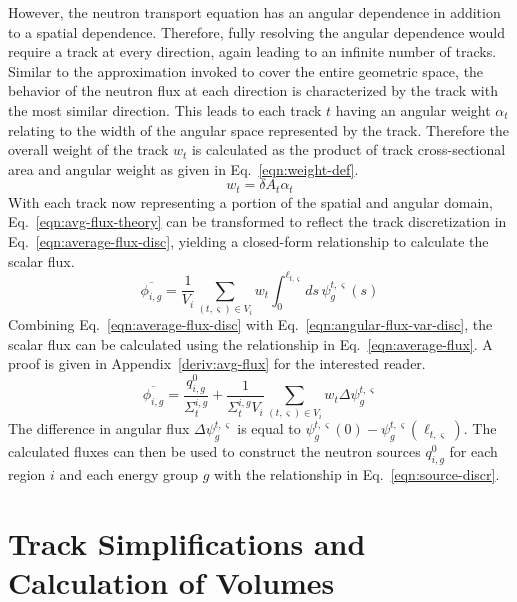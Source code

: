However, the neutron transport equation has an angular dependence in addition to a spatial dependence. Therefore, fully resolving the angular dependence would require a track at every direction, again leading to an infinite number of tracks. Similar to the approximation invoked to cover the entire geometric space, the behavior of the neutron flux at each direction is characterized by the track with the most similar direction. This leads to each track $t$ having an angular weight $\alpha_t$ relating to the width of the angular space represented by the track. Therefore the overall weight of the track $w_t$ is calculated as the product of track cross-sectional area and angular weight as given in Eq.~\ref{eqn:weight-def}.
\begin{equation}
w_{t} = \delta A_{t} \alpha_t
\label{eqn:weight-def}
\end{equation}
With each track now representing a portion of the spatial and angular domain, Eq.~\ref{eqn:avg-flux-theory} can be transformed to reflect the track discretization in Eq.~\ref{eqn:average-flux-disc}, yielding a closed-form relationship to calculate the scalar flux.
\begin{dmath}
	\overline{\phi_{i,g}} = \frac{1}{V_i} \sum_{(t,\varsigma) \in V_i} w_{t} \int_{0}^{\ell_{t,\varsigma}} ds \, \psi^{t,\varsigma}_g(s)
	\label{eqn:average-flux-disc}
\end{dmath}
Combining Eq.~\ref{eqn:average-flux-disc} with Eq.~\ref{eqn:angular-flux-var-disc}, the scalar flux can be calculated using the relationship in Eq.~\ref{eqn:average-flux}. A proof is given in Appendix~\ref{deriv:avg-flux} for the interested reader.
\begin{dmath}
	\overline{\phi_{i,g}} = \frac{q^0_{i,g}}{\Sigma_{t}^{i,g}} + \frac{1}{\Sigma_{t}^{i,g} V_i} \sum_{(t,\varsigma) \in V_i} w_{t} \Delta \psi_g^{t,\varsigma}
	\label{eqn:average-flux}
\end{dmath}
The difference in angular flux $\Delta \psi_g^{t,\varsigma}$ is equal to $\psi_g^{t,\varsigma}(0) - \psi_g^{t,\varsigma}(\ell_{t,\varsigma})$. The calculated fluxes can then be used to construct the neutron sources $q^0_{i,g}$ for each region $i$ and each energy group $g$ with the relationship in Eq.~\ref{eqn:source-discr}.

\section{Track Simplifications and Calculation of Volumes}
\label{sec:track-simplifications}

